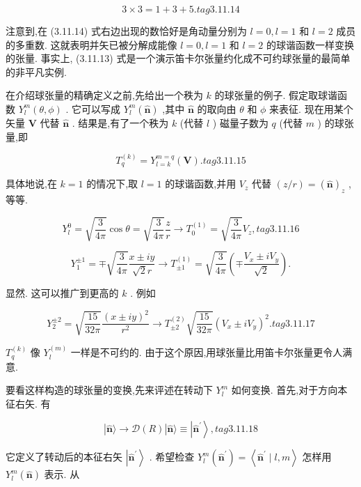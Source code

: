 $$
3 \times 3 = 1 + 3 + 5. tag{3.11.14}
$$

注意到,在 (3.11.14) 式右边出现的数恰好是角动量分别为 $l = 0, l = 1$ 和 $l = 2$ 成员的多重数. 这就表明并矢已被分解成能像 $l = 0, l = 1$ 和 $l = 2$ 的球谐函数一样变换的张量. 事实上, (3.11.13) 式是一个演示笛卡尔张量约化成不可约球张量的最简单的非平凡实例.

在介绍球张量的精确定义之前,先给出一个秩为 $k$ 的球张量的例子. 假定取球谐函数 ${Y}_{l}^{m}\left( {\theta ,\phi }\right)$ . 它可以写成 ${Y}_{l}^{m}\left( \widehat{\mathbf{n}}\right)$ ,其中 $\widehat{\mathbf{n}}$ 的取向由 $\theta$ 和 $\phi$ 来表征. 现在用某个矢量 $\mathbf{V}$ 代替 $\widehat{\mathbf{n}}$ . 结果是,有了一个秩为 $k$ (代替 $l$ ) 磁量子数为 $q$ (代替 $m$ ) 的球张量,即

$$
{T}_{q}^{\left( k\right) } = {Y}_{l = k}^{m = q}\left( \mathbf{V}\right) . tag{3.11.15}
$$

具体地说,在 $k = 1$ 的情况下,取 $l = 1$ 的球谐函数,并用 ${V}_{z}$ 代替 $\left( {z/r}\right) = {\left( \widehat{\mathbf{n}}\right) }_{z}$ ,等等.

$$
{Y}_{l}^{0} = \sqrt{\frac{3}{4\pi }}\cos \theta = \sqrt{\frac{3}{4\pi }}\frac{z}{r} \rightarrow {T}_{0}^{\left( 1\right) } = \sqrt{\frac{3}{4\pi }}{V}_{z}, tag{3.11.16}
$$

$$
{Y}_{1}^{\pm 1} = \mp \sqrt{\frac{3}{4\pi }}\frac{x \pm {iy}}{\sqrt{2}r} \rightarrow {T}_{\pm 1}^{\left( 1\right) } = \sqrt{\frac{3}{4\pi }}\left( {\mp \frac{{V}_{x} \pm i{V}_{y}}{\sqrt{2}}}\right) .
$$

显然. 这可以推广到更高的 $k$ . 例如

$$
{Y}_{2}^{\pm 2} = \sqrt{\frac{15}{32\pi }}\frac{{\left( x \pm iy\right) }^{2}}{{r}^{2}} \rightarrow {T}_{\pm 2}^{\left( 2\right) }\sqrt{\frac{15}{32\pi }}{\left( {V}_{x} \pm i{V}_{y}\right) }^{2}. tag{3.11.17}
$$

${T}_{q}^{\left( k\right) }$ 像 ${Y}_{l}^{\left( m\right) }$ 一样是不可约的. 由于这个原因,用球张量比用笛卡尔张量更令人满意.

要看这样构造的球张量的变换,先来评述在转动下 ${Y}_{l}^{m}$ 如何变换. 首先,对于方向本征右矢. 有

$$
\left| {\widehat{\mathbf{n}}\rangle \rightarrow \mathcal{D}\left( R\right) }\right| \widehat{\mathbf{n}}\rangle \equiv \left| {\widehat{\mathbf{n}}}^{\prime }\right\rangle , tag{3.11.18}
$$

它定义了转动后的本征右矢 $\left| {\widehat{\mathbf{n}}}^{\prime }\right\rangle$ . 希望检查 ${Y}_{l}^{m}\left( {\widehat{\mathbf{n}}}^{\prime }\right) = \left\langle {{\widehat{\mathbf{n}}}^{\prime } \mid l, m}\right\rangle$ 怎样用 ${Y}_{l}^{m}\left( \widehat{\mathbf{n}}\right)$ 表示. 从

